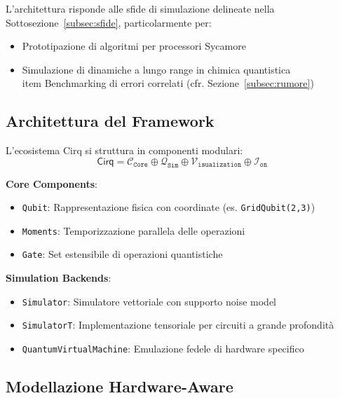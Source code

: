 \documentclass[a4paper,12pt]{report}
\theoremstyle{plain}
\begin{document}
L'architettura risponde alle sfide di simulazione delineate nella Sottosezione~\ref{subsec:sfide}, particolarmente per:
\begin{itemize}
    \item Prototipazione di algoritmi per processori Sycamore
    \item Simulazione di dinamiche a lungo range in chimica quantistica
    \\item Benchmarking di errori correlati (cfr. Sezione~\ref{subsec:rumore})
\end{itemize}

\subsection{Architettura del Framework}
\label{subsec:cirq-arch}

L'ecosistema Cirq si struttura in componenti modulari:
\begin{equation}
\mathsf{Cirq} = \mathcal{C}_{\mathtt{Core}} \oplus \mathcal{Q}_{\mathtt{Sim}} \oplus \mathcal{V}_{\mathtt{isualization}} \oplus \mathcal{I}_{\mathtt{on}}
\end{equation}

\noindent\textbf{Core Components}:
\begin{itemize}
    \item \texttt{Qubit}: Rappresentazione fisica con coordinate (es. \texttt{GridQubit(2,3)})
    \item \texttt{Moments}: Temporizzazione parallela delle operazioni
    \item \texttt{Gate}: Set estensibile di operazioni quantistiche
\end{itemize}

\noindent\textbf{Simulation Backends}:
\begin{itemize}
    \item \texttt{Simulator}: Simulatore vettoriale con supporto noise model
    \item \texttt{SimulatorT}: Implementazione tensoriale per circuiti a grande profondità
    \item \texttt{QuantumVirtualMachine}: Emulazione fedele di hardware specifico
\end{itemize}

\subsection{Modellazione Hardware-Aware}
\label{subsec:cirq-hardware}
\end{document}
